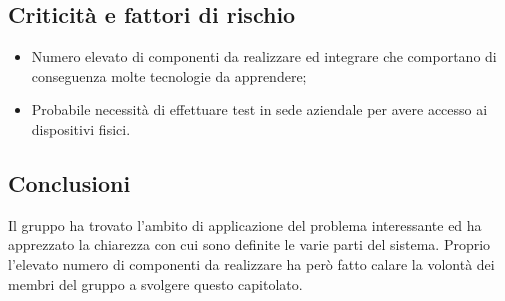 \subsection{Criticità e fattori di rischio}
\begin{itemize}
	\item Numero elevato di componenti da realizzare ed integrare che comportano di conseguenza molte tecnologie da apprendere; 
	\item Probabile necessità di effettuare test in sede aziendale per avere accesso ai dispositivi fisici.
\end{itemize}
\subsection{Conclusioni}
Il gruppo ha trovato l'ambito di applicazione del problema interessante ed ha apprezzato la chiarezza con cui sono definite le varie parti del sistema. Proprio l'elevato numero di componenti da realizzare ha però fatto calare la volontà dei membri del gruppo a svolgere questo capitolato\glo.
